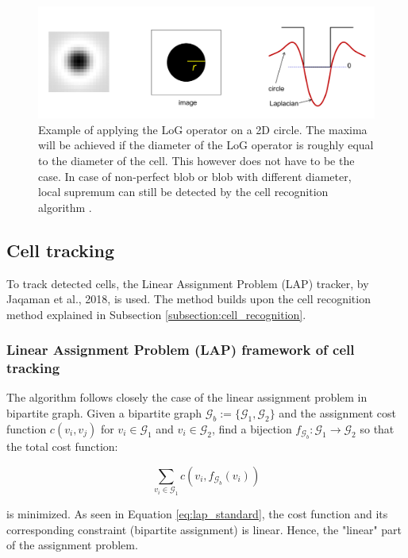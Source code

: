 \documentclass[pdftex,12pt,a4paper]{report}
\begin{document}
\begin{figure}[H]
\centering
\includegraphics[width=\textwidth]{images/log_operator_example}
\caption[Example of application of the LoG operator]{Example of applying the LoG operator on a 2D circle. The maxima will be achieved if the diameter of the LoG operator is roughly equal to the diameter of the cell. This however does not have to be the case. In case of non-perfect blob or blob with different diameter, local supremum can still be detected by the cell recognition algorithm \cite{tinevez2017trackmate}.}
\label{fig:log_example}
\end{figure}

\subsection{Cell tracking}
\label{subsection:cell_tracking}


To track detected cells, the Linear Assignment Problem (LAP) tracker, by Jaqaman et al., 2018, is used. The method builds upon the cell recognition method explained in Subsection \ref{subsection:cell_recognition}.

\subsubsection*{Linear Assignment Problem (LAP) framework of cell tracking}

The algorithm follows closely the case of the linear assignment problem in bipartite graph. Given a bipartite graph $\mathcal{G}_b:= \{\mathcal{G}_1, \mathcal{G}_2\}$ and the assignment cost function 
$c(v_i, v_j)$ for $v_i \in \mathcal{G}_1$ and $v_i \in \mathcal{G}_2$, find a bijection $f_{\mathcal{G}_b} : \mathcal{G}_1 \rightarrow \mathcal{G}_2$ so that the total cost function:

\begin{equation}
\sum_{v_i \in \mathcal{G}_1} c(v_i, f_{\mathcal{G}_b}(v_i))
\label{eq:lap_standard}
\end{equation}

is minimized. As seen in Equation \ref{eq:lap_standard}, the cost function and its corresponding constraint (bipartite assignment) is linear. Hence, the "linear" part of the assignment problem.
\end{document}
